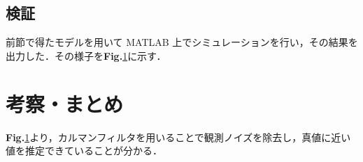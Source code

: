 \documentclass[a4paper,12pt]{jarticle}
\begin{document}
\subsection{検証}
%
前節で得たモデルを用いて MATLAB 上でシミュレーションを行い，その結果を出力した．その様子を{\bf Fig.}\ref{}に示す．


\section{考察・まとめ}
%
{\bf Fig.}\ref{}より，カルマンフィルタを用いることで観測ノイズを除去し，真値に近い値を推定できていることが分かる．











\end{document}
